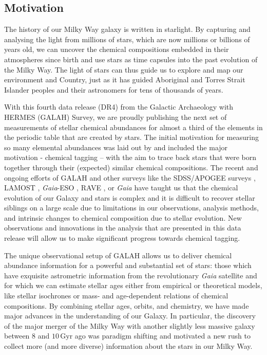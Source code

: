 \documentclass[
  journal=pasa,
  manuscript=research-paper, %
  year=2024,
  volume=37
]{cup-journal}
\newcommand{\Gaia}{\textit{Gaia}\xspace}
\begin{document}
\subsection{Motivation} \label{sec:motivation}

The history of our Milky Way galaxy is written in starlight. By capturing and analysing the light from millions of stars, which are now millions or billions of years old, we can uncover the chemical compositions embedded in their atmospheres since birth and use stars as time capsules into the past evolution of the Milky Way. The light of stars can thus guide us to explore and map our environment and Country, just as it has guided Aboriginal and Torres Strait Islander peoples and their astronomers for tens of thousands of years.

With this fourth data release (DR4) from the Galactic Archaeology with HERMES (GALAH) Survey, we are proudly publishing the next set of measurements of stellar chemical abundances for almost a third of the elements in the periodic table that are created by stars. The initial motivation for measuring so many elemental abundances was laid out by \citet{DeSilva2015} and included the major motivation - chemical tagging -- with the aim to trace back stars that were born together through their (expected) similar chemical compositions. The recent and ongoing efforts of GALAH and other surveys like the SDSS/APOGEE surveys \citep[e.g.][]{SDSSDR17, Kollmeier2017}, LAMOST \citep{Zhao2012}, \Gaia-ESO \citep{Gilmore2022,Hourihane2023}, RAVE \citep{Steinmetz2020a}, or \Gaia \citep{RecioBlanco2023} have taught us that the chemical evolution of our Galaxy and stars is complex and it is difficult to recover stellar siblings on a large scale due to limitations in our observations, analysis methods, and intrinsic changes to chemical composition due to stellar evolution. New observations and innovations in the analysis that are presented in this data release will allow us to make significant progress towards chemical tagging.

The unique observational setup of GALAH allows us to deliver chemical abundance information for a powerful and substantial set of stars: those which have exquisite astrometric information from the revolutionary \Gaia satellite \citep{Gaia-Collaboration2016} and for which we can estimate stellar ages either from empirical or theoretical models, like stellar isochrones or mass- and age-dependent relations of chemical compositions. By combining stellar ages, orbits, and chemistry, we have made major advances in the understanding of our Galaxy. In particular, the discovery of the major merger of the Milky Way with another slightly less massive galaxy between 8 and $10\,\mathrm{Gyr}$ ago \citep{Belokurov2018, Helmi2018} was paradigm shifting and motivated a new rush to collect more (and more diverse) information about the stars in our Milky Way.
\end{document}
